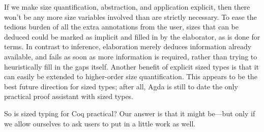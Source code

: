 If we make size quantification, abstraction, and application explicit,
then there won't be any more size variables involved than are strictly necessary.
To ease the tedious burden of all the extra annotations from the user,
sizes that can be deduced could be marked as implicit and filled in by the elaborator, as is done for terms.
In contrast to inference, elaboration merely deduces information already available,
and fails as soon as more information is required,
rather than trying to heuristically fill in the gaps itself.
Another benefit of explicit sized types is that it can easily be extended to higher-order size quantification.
This appears to be the best future direction for sized types;
after all, Agda is still to date the only practical proof assistant with sized types.

So is sized typing for Coq practical?
Our answer is that it might be---but only if we allow ourselves to ask users to put in a little work as well.

